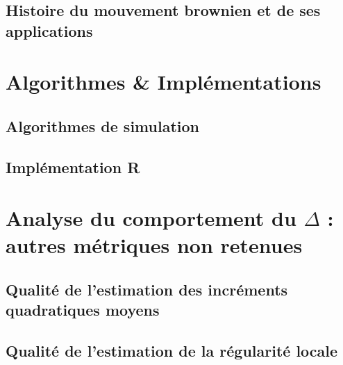 \section{Histoire du mouvement brownien et de ses applications}

\pagebreak


\chapter{Algorithmes \& Implémentations}

\label{annexe:code}
\section{Algorithmes de simulation}



\pagebreak

\section{Implémentation R}
\label{annexe:code-R}



\chapter{
  Analyse du comportement du $\Delta$ : autres métriques non retenues
 }

\section{Qualité de l'estimation des incréments quadratiques moyens}


\section{Qualité de l'estimation de la régularité locale}


